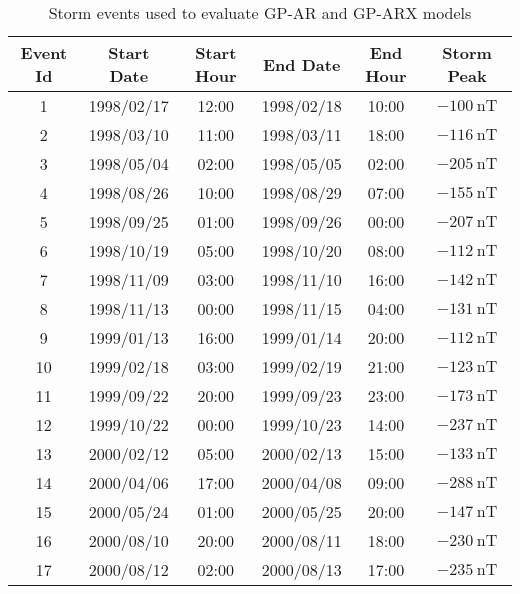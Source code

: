    \begin{table}[ht]
    \centering
    \caption{Storm events used to evaluate GP-AR and GP-ARX models}
    \label{table:teststorms}
    \begin{adjustbox}{width=\textwidth,totalheight=0.95\textheight,keepaspectratio}
    \begin{tabular}{cccccc}
    \hline
    \textbf{Event Id} & \textbf{Start Date} & \textbf{Start Hour} & \textbf{End Date} & \textbf{End Hour} & \textbf{Storm Peak} \\ \hline
    1 & 1998/02/17 & 12:00 & 1998/02/18 & 10:00 & $ \SI{-100}{\nano\tesla}$ \\
    2 & 1998/03/10 & 11:00 & 1998/03/11 & 18:00 & $ \SI{-116}{\nano\tesla}$ \\
    3 & 1998/05/04 & 02:00 & 1998/05/05 & 02:00 & $ \SI{-205}{\nano\tesla}$ \\
    4 & 1998/08/26 & 10:00 & 1998/08/29 & 07:00 & $ \SI{-155}{\nano\tesla}$ \\
    5 & 1998/09/25 & 01:00 & 1998/09/26 & 00:00 & $ \SI{-207}{\nano\tesla}$ \\
    6 & 1998/10/19 & 05:00 & 1998/10/20 & 08:00 & $ \SI{-112}{\nano\tesla}$ \\
    7 & 1998/11/09 & 03:00 & 1998/11/10 & 16:00 & $ \SI{-142}{\nano\tesla}$ \\
    8 & 1998/11/13 & 00:00 & 1998/11/15 & 04:00 & $ \SI{-131}{\nano\tesla}$ \\
    9 & 1999/01/13 & 16:00 & 1999/01/14 & 20:00 & $ \SI{-112}{\nano\tesla}$ \\
    10 & 1999/02/18 & 03:00 & 1999/02/19 & 21:00 & $ \SI{-123}{\nano\tesla}$ \\
    11 & 1999/09/22 & 20:00 & 1999/09/23 & 23:00 & $ \SI{-173}{\nano\tesla}$ \\
    12 & 1999/10/22 & 00:00 & 1999/10/23 & 14:00 & $ \SI{-237}{\nano\tesla}$ \\
    13 & 2000/02/12 & 05:00 & 2000/02/13 & 15:00 & $ \SI{-133}{\nano\tesla}$ \\
    14 & 2000/04/06 & 17:00 & 2000/04/08 & 09:00 & $ \SI{-288}{\nano\tesla}$ \\
    15 & 2000/05/24 & 01:00 & 2000/05/25 & 20:00 & $ \SI{-147}{\nano\tesla}$ \\
    16 & 2000/08/10 & 20:00 & 2000/08/11 & 18:00 & $ \SI{-230}{\nano\tesla}$ \\
    17 & 2000/08/12 & 02:00 & 2000/08/13 & 17:00 & $ \SI{-235}{\nano\tesla}$ \\

\end{tabular}
\end{adjustbox}
\end{table}
